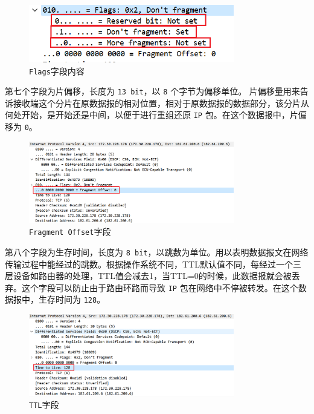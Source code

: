 \documentclass{article}
\begin{document}
\begin{figure}[H]
  \centering
  \includegraphics[width=0.8\textwidth]{img/15.png}
  \caption{\texttt{Flags}字段内容}
  \label{fig:13}
\end{figure}

第七个字段为片偏移，长度为 \texttt{13 bit}，以 \texttt{8} 个字节为偏移单位。 片偏移量用来告诉接收端这个分片在原数据报的相对位置，相对于原数据报的数据部分，该分片从何处开始，是开始还是中间，以便于进行重组还原 \texttt{IP} 包。在这个数据报中，片偏移为 \texttt{0}。

\begin{figure}[H]
  \centering
  \includegraphics[width=0.8\textwidth]{img/15_2.png}
  \caption{\texttt{Fragment Offset}字段}
  \label{fig:14}
\end{figure}

第八个字段为生存时间，长度为 \texttt{8 bit}，以跳数为单位。用以表明数据报文在网络传输过程中能经过的跳数。根据操作系统不同，TTL默认值不同，每经过一个三层设备如路由器的处理，TTL值会减去1，当TTL=0的时候，此数据报就会被丢弃。这个字段可以防止由于路由环路而导致 \texttt{IP} 包在网络中不停被转发。在这个数据报中，生存时间为 \texttt{128}。

\begin{figure}[H]
  \centering
  \includegraphics[width=0.8\textwidth]{img/16.png}
  \caption{\texttt{TTL}字段}
  \label{fig:15}
\end{figure}
\end{document}
